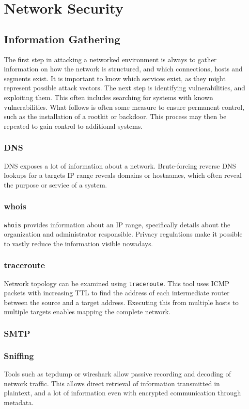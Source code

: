 \chapter{Network Security}
\section{Information Gathering}
The first step in attacking a networked environment is always to gather
information on how the network is structured, and which connections, hosts and
segments exist. It is important to know which services exist, as they might
represent possible attack vectors. The next step is identifying vulnerabilities,
and exploiting them. This often includes searching for systems with known
vulnerabilities. What follows is often some measure to ensure permanent control,
such as the installation of a rootkit or backdoor. This process may then be
repeated to gain control to additional systems.

\subsection{DNS}
DNS exposes a lot of information about a network. Brute-forcing reverse DNS
lookups for a targets IP range reveals domains or hostnames, which often reveal
the purpose or service of a system.

\subsection{whois}
\texttt{whois} provides information about an IP range, specifically details
about the organization and administrator responsible. Privacy regulations make
it possible to vastly reduce the information visible nowadays.

\subsection{traceroute}
Network topology can be examined using \texttt{traceroute}. This tool uses ICMP
packets with increasing TTL to find the address of each intermediate router
between the source and a target address. Executing this from multiple hosts to
multiple targets enables mapping the complete network.

\subsection{SMTP}
\subsection{Sniffing}
Tools such as tcpdump or wireshark allow passive recording and decoding of
network traffic. This allows direct retrieval of information transmitted in
plaintext, and a lot of information even with encrypted communication through
metadata.

